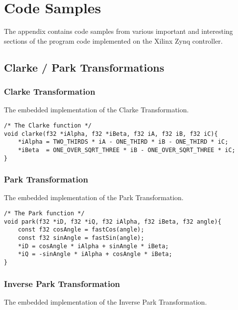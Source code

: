 \section{Code Samples}
\label{app:code_samples}
The appendix contains code samples from various important and interesting sections of the program code implemented on the Xilinx Zynq controller.

\subsection{Clarke / Park Transformations}
\subsubsection*{Clarke Transformation}
\label{app:clark}
The embedded implementation of the Clarke Transformation.

\begin{lstlisting}[style=c, caption=Embedded Clarke Transformation., label=app:code:clarke]
/* The Clarke function */
void clarke(f32 *iAlpha, f32 *iBeta, f32 iA, f32 iB, f32 iC){
	*iAlpha = TWO_THIRDS * iA - ONE_THIRD * iB - ONE_THIRD * iC;
	*iBeta  = ONE_OVER_SQRT_THREE * iB - ONE_OVER_SQRT_THREE * iC;
}
\end{lstlisting}

\subsubsection*{Park Transformation}
\label{app:park}
The embedded implementation of the Park Transformation.
\begin{lstlisting}[style=c, caption=Embedded Park Transformation., label=app:code:park]
/* The Park function */
void park(f32 *iD, f32 *iQ, f32 iAlpha, f32 iBeta, f32 angle){
	const f32 cosAngle = fastCos(angle);
	const f32 sinAngle = fastSin(angle);
	*iD = cosAngle * iAlpha + sinAngle * iBeta;
	*iQ = -sinAngle * iAlpha + cosAngle * iBeta;
}
\end{lstlisting}


\subsubsection*{Inverse Park Transformation}
\label{app:inverse_park}
The embedded implementation of the Inverse Park Transformation.

